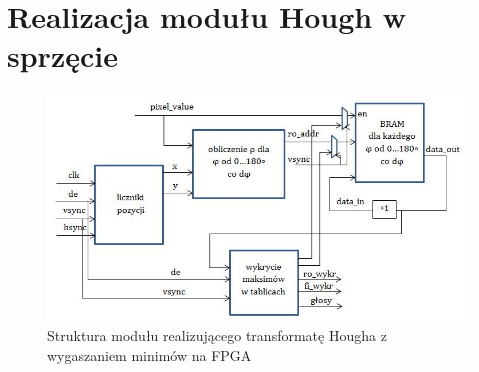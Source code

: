 \section{Realizacja modułu Hough w sprzęcie}


%

\begin{figure}[!htb]
\centering
\includegraphics[scale=0.7]{img/schemat_hough.png}
\caption{Struktura modułu realizującego transformatę Hougha z wygaszaniem minimów na FPGA}
\label{rys:start1}
\end{figure}



